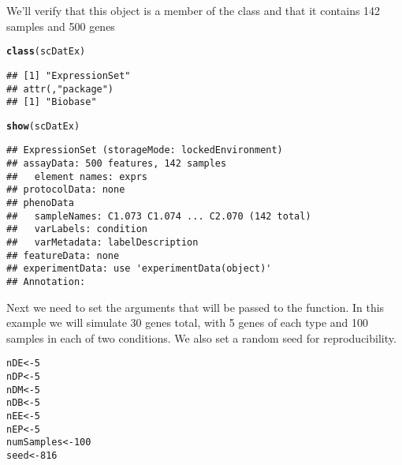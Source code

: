 \documentclass{article}\usepackage[]{graphicx}\usepackage[]{color}
\makeatletter
\newcommand{\hlnum}[1]{\textcolor[rgb]{0.686,0.059,0.569}{#1}}%
\newcommand{\hlstd}[1]{\textcolor[rgb]{0.345,0.345,0.345}{#1}}%
\newcommand{\hlkwb}[1]{\textcolor[rgb]{0.69,0.353,0.396}{#1}}%
\newcommand{\hlkwd}[1]{\textcolor[rgb]{0.737,0.353,0.396}{\textbf{#1}}}%
\newenvironment{kframe}{%
 \def\at@end@of@kframe{}%
 \ifinner\ifhmode%
  \def\at@end@of@kframe{\end{minipage}}%
  \begin{minipage}{\columnwidth}%
 \fi\fi%
 \def\FrameCommand##1{\hskip\@totalleftmargin \hskip-\fboxsep
 \colorbox{shadecolor}{##1}\hskip-\fboxsep
     \hskip-\linewidth \hskip-\@totalleftmargin \hskip\columnwidth}%
 \MakeFramed {\advance\hsize-\width
   \@totalleftmargin\z@ \linewidth\hsize
   \@setminipage}}%
 {\par\unskip\endMakeFramed%
 \at@end@of@kframe}
\newenvironment{knitrout}{}{} %
\makeatother
\begin{document}
We'll verify that this object is a member of the  class and that it contains 142 samples and 500 genes
\begin{knitrout}
\color{fgcolor}\begin{kframe}
\begin{alltt}
\hlkwd{class}\hlstd{(scDatEx)}
\end{alltt}
\begin{verbatim}
## [1] "ExpressionSet"
## attr(,"package")
## [1] "Biobase"
\end{verbatim}
\begin{alltt}
\hlkwd{show}\hlstd{(scDatEx)}
\end{alltt}
\begin{verbatim}
## ExpressionSet (storageMode: lockedEnvironment)
## assayData: 500 features, 142 samples 
##   element names: exprs 
## protocolData: none
## phenoData
##   sampleNames: C1.073 C1.074 ... C2.070 (142 total)
##   varLabels: condition
##   varMetadata: labelDescription
## featureData: none
## experimentData: use 'experimentData(object)'
## Annotation:
\end{verbatim}
\end{kframe}
\end{knitrout}
Next we need to set the arguments that will be passed to the  function.  In this example we will simulate 30 genes total, with 5 genes of each type and 100 samples in each of two conditions.  We also set a random seed for reproducibility.

\begin{knitrout}
\color{fgcolor}\begin{kframe}
\begin{alltt}
\hlstd{nDE} \hlkwb{<-} \hlnum{5}
\hlstd{nDP} \hlkwb{<-} \hlnum{5}
\hlstd{nDM} \hlkwb{<-} \hlnum{5}
\hlstd{nDB} \hlkwb{<-} \hlnum{5}
\hlstd{nEE} \hlkwb{<-} \hlnum{5}
\hlstd{nEP} \hlkwb{<-} \hlnum{5}
\hlstd{numSamples} \hlkwb{<-} \hlnum{100}
\hlstd{seed} \hlkwb{<-} \hlnum{816}
\end{alltt}
\end{kframe}
\end{knitrout}
\end{document}
